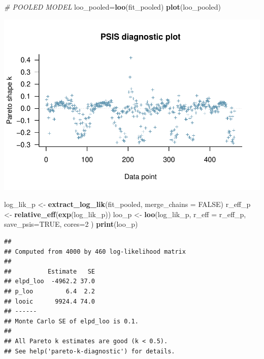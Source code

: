 \documentclass[]{article}
\newenvironment{Shaded}{\begin{snugshade}}{\end{snugshade}}
\newcommand{\KeywordTok}[1]{\textcolor[rgb]{0.13,0.29,0.53}{\textbf{#1}}}
\newcommand{\DataTypeTok}[1]{\textcolor[rgb]{0.13,0.29,0.53}{#1}}
\newcommand{\DecValTok}[1]{\textcolor[rgb]{0.00,0.00,0.81}{#1}}
\newcommand{\StringTok}[1]{\textcolor[rgb]{0.31,0.60,0.02}{#1}}
\newcommand{\CommentTok}[1]{\textcolor[rgb]{0.56,0.35,0.01}{\textit{#1}}}
\newcommand{\OtherTok}[1]{\textcolor[rgb]{0.56,0.35,0.01}{#1}}
\newcommand{\NormalTok}[1]{#1}
\begin{document}
\begin{Shaded}
\begin{Highlighting}[]
\CommentTok{# POOLED MODEL}
\NormalTok{loo_pooled=}\KeywordTok{loo}\NormalTok{(fit_pooled) }
\KeywordTok{plot}\NormalTok{(loo_pooled)}
\end{Highlighting}
\end{Shaded}

\includegraphics{Data_science_project_files/figure-latex/unnamed-chunk-14-2.pdf}

\begin{Shaded}
\begin{Highlighting}[]
\NormalTok{log_lik_p <-}\StringTok{ }\KeywordTok{extract_log_lik}\NormalTok{(fit_pooled, }\DataTypeTok{merge_chains =} \OtherTok{FALSE}\NormalTok{)}
\NormalTok{r_eff_p <-}\StringTok{ }\KeywordTok{relative_eff}\NormalTok{(}\KeywordTok{exp}\NormalTok{(log_lik_p))}
\NormalTok{loo_p <-}\StringTok{ }\KeywordTok{loo}\NormalTok{(log_lik_p, }\DataTypeTok{r_eff =}\NormalTok{ r_eff_p, }\DataTypeTok{save_psis=}\OtherTok{TRUE}\NormalTok{, }\DataTypeTok{cores=}\DecValTok{2}\NormalTok{ )}
\KeywordTok{print}\NormalTok{(loo_p)}
\end{Highlighting}
\end{Shaded}

\begin{verbatim}
## 
## Computed from 4000 by 460 log-likelihood matrix
## 
##          Estimate   SE
## elpd_loo  -4962.2 37.0
## p_loo         6.4  2.2
## looic      9924.4 74.0
## ------
## Monte Carlo SE of elpd_loo is 0.1.
## 
## All Pareto k estimates are good (k < 0.5).
## See help('pareto-k-diagnostic') for details.
\end{verbatim}
\end{document}
